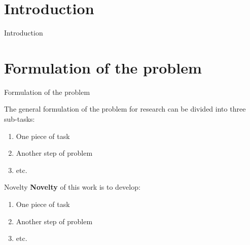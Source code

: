 \section{Introduction} %
\begin{frame}{Introduction}
    
\end{frame}

\section{Formulation of the problem}
\begin{frame}{Formulation of the problem}
\label{sec:task}

The general formulation of the problem for research can be divided into three sub-tasks:
\begin{enumerate}
  \item One piece of task
  \item Another step of problem
  \item etc.
\end{enumerate}
\end{frame}

\begin{frame}{Novelty}
\textbf{Novelty} of this work is to develop:
\begin{enumerate}
  \item One piece of task
  \item Another step of problem
  \item etc.
\end{enumerate}
\end{frame} 